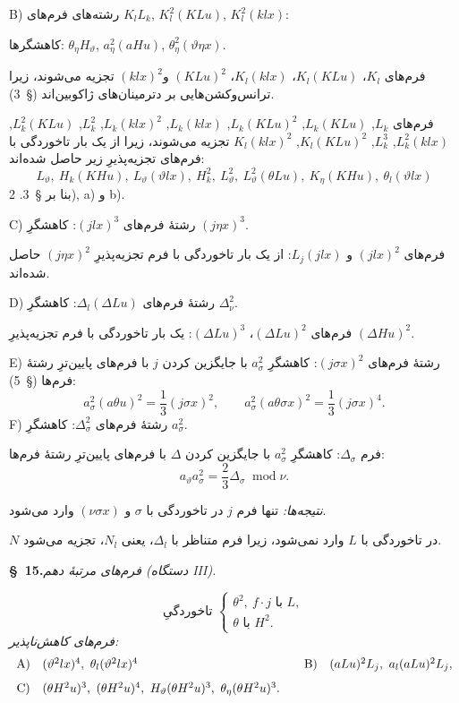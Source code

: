 \documentclass[11pt]{article}
\providecommand{\A}{\Delta}
\providecommand{\modu}[1]{\;\operatorname{mod} #1}
\begin{document}
B) رشته‌های فرم‌های $K_lL_k$, $K_l^2(KLu)$, $K_l^2(klx)$:

کاهشگرها: $\theta_\eta H_\vartheta$, $a_\eta^2(aHu)$, $\theta_\eta^2(\vartheta\eta x)$.

فرم‌های $K_l$، $K_l(KLu)$، $K_l(klx)$، $(KLu)^2$ و$(klx)^2$ تجزیه می‌شوند، زیرا ترانس‌وکشن‌هایی بر دترمینان‌های ژاکوبین‌اند (\S\ 3).

فرم‌های $L_k$, $L_k(KLu)$, $L_k(KLu)^2$, $L_k(klx)$, $L_k(klx)^2$, $L_k^2$, $L_k^2(KLu)$, $L_k^2(klx)$, $L_k^3$, $K_l(KLu)^2$, $K_l(klx)^2$ تجزیه می‌شوند، زیرا از یک بار تاخوردگی با فرم‌های تجزیه‌پذیرِ زیر حاصل شده‌اند:
\[
L_\vartheta,
\ H_k(KHu),
\ L_\vartheta(\vartheta lx),
\ H_k^2,
\ L_\vartheta^2,
\ L_\vartheta^2(\theta Lu),
\ K_\eta(KHu),
\ \theta_l(\vartheta lx)
\]
بنا بر \S\ 3. 2), a) و b).

C) رشتهٔ فرم‌های $(jlx)^3$: کاهشگرِ $(j\eta x)^3$.

فرم‌های $(jlx)^2$ و $L_j(jlx)$: از یک بار تاخوردگی با فرم تجزیه‌پذیرِ $(j\eta x)^2$ حاصل شده‌اند.

D) رشتهٔ فرم‌های $\A_l(\A Lu)$: کاهشگرِ $\A_\nu^2$.

فرم‌های $(\A Lu)^2$، $(\A Lu)^3$: یک بار تاخوردگی با فرم تجزیه‌پذیرِ $(\A Hu)^2$.

E) رشتهٔ فرم‌های $(j\sigma x)^2$: کاهشگرِ $a_\sigma^2$ با جایگزین کردن $j$ با فرم‌های پایین‌ترِ رشتهٔ فرم‌ها (\S\ 5):
\[
a_\sigma^2(a\theta u)^2=\frac13(j\sigma x)^2,
\qquad
 a_\sigma^2(a\theta\sigma x)^2=\frac13(j\sigma x)^4.
\]
F) رشتهٔ فرم‌های $\A_\sigma^2$: کاهشگرِ $a_\sigma^2$.

فرم $\A_\sigma$: کاهشگرِ $a_\sigma^2$ با جایگزین کردن $\A$ با فرم‌های پایین‌ترِ رشتهٔ فرم‌ها:
\[
a_\vartheta a_\sigma^2=\frac23\A_\sigma\modu{\nu}.
\]

\noindent\emph{نتیجه‌ها:} تنها فرم $j$ در تاخوردگی با $\sigma$ و $(\nu\sigma x)$ وارد می‌شود.

$N$ در تاخوردگی با $L$ وارد نمی‌شود، زیرا فرم متناظر با $\A_l$، یعنی $N_l$، تجزیه می‌شود.

\begin{center}
\textbf{\S\ 15.}\quad\emph{فرم‌های مرتبهٔ دهم (دستگاه III).}
\end{center}
\[
\text{تاخوردگیِ }\left\{\begin{array}{l}
\theta^2,
\ f\cdot j\text{ با }L,\\
\theta\text{ با }H^2.
\end{array}\right.
\]
\noindent\emph{فرم‌های کاهش‌ناپذیر:}
\[
\begin{array}{c@{\quad}l@{\qquad}c@{\quad}l}
\text{A)}&(\vartheta^2lx)^4,
\ \theta_l(\vartheta^2lx)^4&
\text{B)}&(aLu)^2L_j,
\ a_l(aLu)^2L_j,\\[0.8em]
\text{C)}&(\theta H^2u)^3,
\ (\theta H^2u)^4,
\ H_\vartheta(\theta H^2u)^3,
\ \theta_\eta(\theta H^2u)^3.
\end{array}
\]
\end{document}

